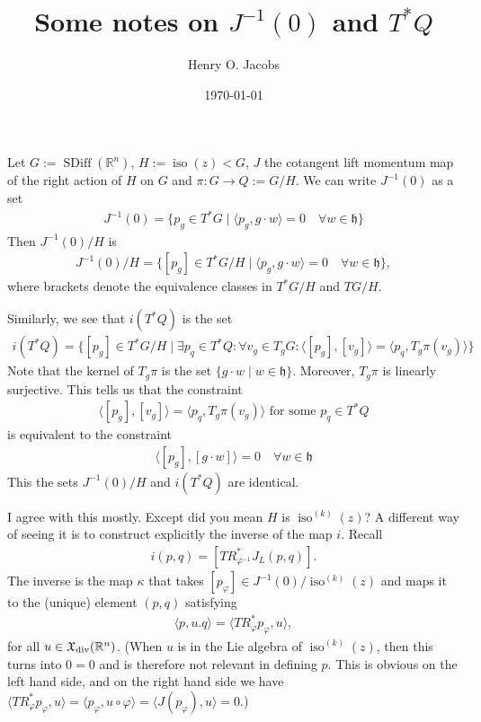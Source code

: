 \documentclass[12pt]{amsart}
\title{Some notes on $J^{-1}(0)$ and $T^*Q$}
\author{Henry O. Jacobs}
\date{\today}
\DeclareMathOperator{\SDiff}{SDiff}
\DeclareMathOperator{\iso}{iso}
\begin{document}
\maketitle

Let $G := \SDiff(\mathbb{R}^n)$, $H := \iso(z) < G$, $J$ the cotangent
lift momentum map of the right action of $H$ on $G$ and
$\pi\colon G \to Q := G/H$. We can write $J^{-1}(0)$ as a set
\begin{align*}
	J^{-1}(0) = \{ p_g \in T^*G \mid \langle p_g , g \cdot w \rangle = 0 \quad \forall w \in \mathfrak{h} \}
\end{align*}
Then $J^{-1}(0) / H$ is
\begin{align*}
	J^{-1}(0) / H = \{ [p_g] \in T^*G/H \mid  \langle p_g , g \cdot w \rangle = 0 \quad \forall w \in \mathfrak{h} \},
\end{align*}
where brackets denote the equivalence classes in $T^*G/H$ and $TG/H$.

Similarly, we see that $i(T^*Q)$ is the set
\begin{align*}
	i(T^*Q) = \{ [p_g] \in T^*G/H \mid \exists p_q \in T^*Q\colon \forall v_g \in T_g G\colon \langle [p_g] , [v_g] \rangle = \langle p_q , T_g\pi(v_g) \rangle \}
\end{align*}
Note that the kernel of $T_g\pi$ is the set $\{ g \cdot w \mid w \in \mathfrak{h}\}$.
Moreover, $T_g \pi$ is linearly surjective.
This tells us that the constraint
\begin{align*}
	\langle [p_g] , [v_g] \rangle = \langle p_q , T_g\pi(v_g) \rangle \text{ for some } p_q \in T^*Q
\end{align*}
is equivalent to the constraint
\begin{align*}
	\langle [p_g], [g \cdot w] \rangle = 0 \quad \forall w \in \mathfrak{h}
\end{align*}
This the sets $J^{-1}(0) / H $ and $i(T^*Q)$ are identical.

\vspace{1cm}

 I agree with this mostly. Except did you mean $H$ is $\iso^{(k)}(z)$? A different way of seeing it is to construct explicitly the inverse of the map $i$. Recall
\begin{align}
	i(p, q) = [ TR^*_{\varphi^{-1}} J_L(p, q)].
\end{align}
The inverse is the map $\kappa$ that takes $[p_\varphi] \in J^{-1}(0)/\iso^{(k)}(z)$ and maps it to the (unique) element $(p, q)$ satisfying
\begin{align}
	\langle p, u.q\rangle = \langle TR^*_\varphi p_\varphi, u \rangle,
\end{align}
for all $u \in \mathfrak{X}_{\rm div}(\mathbb{R}^n)$. (When $u$ is in the Lie algebra of $\iso^{(k)}(z)$, then this turns into $0 = 0$ and is therefore not relevant in defining $p$. This is obvious on the left hand side, and on the right hand side we have $\langle TR^*_\varphi p_\varphi, u \rangle = \langle p_\varphi, u \circ \varphi\rangle = \langle J(p_\varphi), u\rangle = 0$.)
\end{document}
